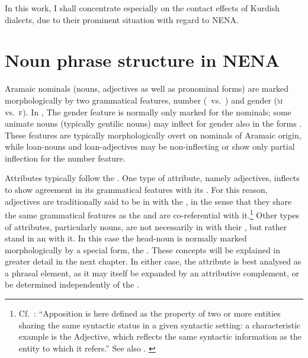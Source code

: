 In this work, I shall concentrate especially on the contact effects of Kurdish dialects, due to their prominent situation with regard to NENA. 



\section{Noun phrase structure in NENA} \label{ss:intro_NPstructure}

Aramaic nominals (nouns, adjectives as well as pronominal forms) are marked morphologically by two grammatical features, number (\sg\ vs.\ \pl) and gender (\textsc{m} vs.\ \textsc{f}). In , The gender feature is normally only marked for the \sg* nominals; some animate nouns (typically gentilic nouns) may inflect for gender also in the \pl* forms \citep[e.g. in \Qar:][212]{KhanQaraqosh}. These features are typically morphologically overt on nominals of Aramaic origin, while loan-nouns and loan-adjectives may be non-inflecting or show only partial inflection for the number feature.

Attributes typically follow the . One type of attribute, namely adjectives, inflects to show agreement in its grammatical features with its . For this reason,  adjectives are traditionally said to  be in  with the , in the sense that they share the same grammatical features as the  and are co-referential with it.\footnote{Cf.\ \citet[28]{CohenSha}: \enquote{Apposition is here defined as the property of two or more entities sharing the same syntactic status in a given syntactic setting: a characteristic example is the  Adjective, which reflects the same syntactic information as the entity to which it refers.} See also . \label{ft:Cohen_Apposition}}  Other types of attributes,  particularly nouns, are not necessarily in  with their , but rather stand in an  with it. In this case the head-noun is normally marked morphologically by a special form, the . These concepts will be explained in greater detail in the next chapter. In either case, the attribute is best analysed as a phrasal element, as it may itself be expanded by an attributive complement, or be determined independently of the . 

